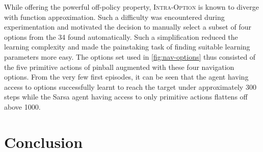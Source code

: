 \documentclass[12pt, oneside, extrafontsizes]{memoir}  %
\theoremstyle{plain}
\theoremstyle{definition}
\begin{document}
While offering the powerful off-policy property, \textsc{Intra-Option} is known to diverge with function approximation. Such a difficulty was encountered during experimentation and motivated the decision to manually select a subset of four options from the 34 found automatically. Such a simplification reduced the learning complexity and made the painstaking task of finding suitable learning parameters more easy. The options set used in \ref{fig:nav-options} thus consisted of the five primitive actions of pinball augmented with these four navigation options. From the very few first episodes, it can be seen that the agent having access to options successfully learnt to reach the target under approximately 300 steps while the Sarsa agent having access to only primitive actions flattens off above 1000. 


\chapter{Conclusion}
\cite{Hauskrecht2013}




\end{document}
